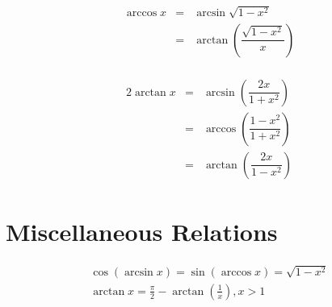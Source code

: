 \begin{equation}
	\begin{aligned}
		\begin{split}
			\arccos x & = & \arcsin \sqrt{1-x^2}\\
			& = & \arctan \left(\dfrac{\sqrt{1-x^2}}{x}\right)
		\end{split}
	\end{aligned}
\end{equation}

\begin{equation}
	\begin{aligned}
		\begin{split}
			2\arctan x & = & \arcsin\left(\dfrac{2x}{1+x^2}\right)\\
			& = & \arccos \left(\dfrac{1-x^2}{1+x^2}\right)\\
			& = & \arctan \left(\dfrac{2x}{1-x^2}\right)
		\end{split}
	\end{aligned}
\end{equation}

\section{Miscellaneous Relations}
\begin{align}
	\cos(\arcsin x)=\sin(\arccos x)=\sqrt{1-x^2}\\
	\arctan x=\frac{\pi}{2}-\arctan\left(\frac{1}{x}\right), x>1
\end{align}
